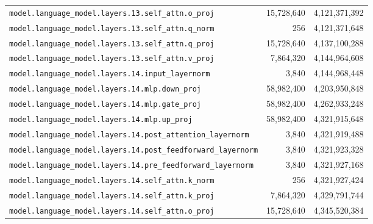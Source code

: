 \documentclass[10pt,a4paper]{article}
\theoremstyle{definition}
\begin{document}
\begin{appendices}
\begin{longtable}{p{9.5cm}rr}
\texttt{model.\allowbreak{}language\_model.\allowbreak{}layers.\allowbreak{}13.\allowbreak{}self\_attn.\allowbreak{}o\_proj} & 15,728,640 & 4,121,371,392 \\
\texttt{model.\allowbreak{}language\_model.\allowbreak{}layers.\allowbreak{}13.\allowbreak{}self\_attn.\allowbreak{}q\_norm} & 256 & 4,121,371,648 \\
\texttt{model.\allowbreak{}language\_model.\allowbreak{}layers.\allowbreak{}13.\allowbreak{}self\_attn.\allowbreak{}q\_proj} & 15,728,640 & 4,137,100,288 \\
\texttt{model.\allowbreak{}language\_model.\allowbreak{}layers.\allowbreak{}13.\allowbreak{}self\_attn.\allowbreak{}v\_proj} & 7,864,320 & 4,144,964,608 \\
\texttt{model.\allowbreak{}language\_model.\allowbreak{}layers.\allowbreak{}14.\allowbreak{}input\_layernorm} & 3,840 & 4,144,968,448 \\
\texttt{model.\allowbreak{}language\_model.\allowbreak{}layers.\allowbreak{}14.\allowbreak{}mlp.\allowbreak{}down\_proj} & 58,982,400 & 4,203,950,848 \\
\texttt{model.\allowbreak{}language\_model.\allowbreak{}layers.\allowbreak{}14.\allowbreak{}mlp.\allowbreak{}gate\_proj} & 58,982,400 & 4,262,933,248 \\
\texttt{model.\allowbreak{}language\_model.\allowbreak{}layers.\allowbreak{}14.\allowbreak{}mlp.\allowbreak{}up\_proj} & 58,982,400 & 4,321,915,648 \\
\texttt{model.\allowbreak{}language\_model.\allowbreak{}layers.\allowbreak{}14.\allowbreak{}post\_attention\_layernorm} & 3,840 & 4,321,919,488 \\
\texttt{model.\allowbreak{}language\_model.\allowbreak{}layers.\allowbreak{}14.\allowbreak{}post\_feedforward\_layernorm} & 3,840 & 4,321,923,328 \\
\texttt{model.\allowbreak{}language\_model.\allowbreak{}layers.\allowbreak{}14.\allowbreak{}pre\_feedforward\_layernorm} & 3,840 & 4,321,927,168 \\
\texttt{model.\allowbreak{}language\_model.\allowbreak{}layers.\allowbreak{}14.\allowbreak{}self\_attn.\allowbreak{}k\_norm} & 256 & 4,321,927,424 \\
\texttt{model.\allowbreak{}language\_model.\allowbreak{}layers.\allowbreak{}14.\allowbreak{}self\_attn.\allowbreak{}k\_proj} & 7,864,320 & 4,329,791,744 \\
\texttt{model.\allowbreak{}language\_model.\allowbreak{}layers.\allowbreak{}14.\allowbreak{}self\_attn.\allowbreak{}o\_proj} & 15,728,640 & 4,345,520,384 \\

\end{longtable}
\end{appendices}
\end{document}
